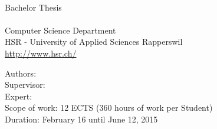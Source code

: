 \begin{titlepage}
\begin{flushleft}
{\huge \bfseries \TITLE}\\[2.5cm]

Bachelor Thesis \\
\SEMESTER \\
Computer Science Department \\
HSR - University of Applied Sciences Rapperswil \\
\url{http://www.hsr.ch/}\\[2cm]


\vfill

Authors: \AUTHOR \\
Supervisor: \SUPERVISOR \\
Expert: \EXPERT \\
Scope of work: 12 ECTS (360 hours of work per Student) \\
Duration: February 16 until June 12, 2015 \\

\end{flushleft}
\end{titlepage}
